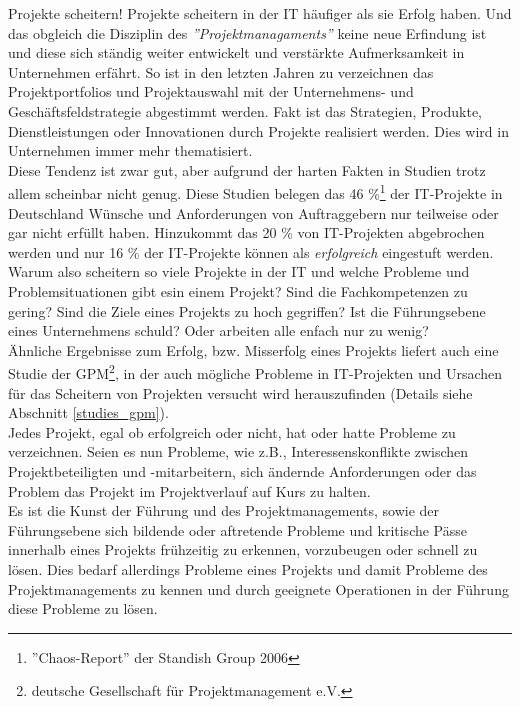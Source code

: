 \documentclass[12pt]{scrartcl}
\begin{document}
Projekte scheitern! Projekte scheitern in der IT häufiger als sie Erfolg haben. Und das obgleich die Disziplin des \textit{''Projektmanagaments''} keine neue Erfindung ist und diese sich ständig weiter entwickelt und verstärkte Aufmerksamkeit in Unternehmen erfährt. So ist in den letzten Jahren zu verzeichnen das Projektportfolios und Projektauswahl mit der Unternehmens- und Geschäftsfeldstrategie abgestimmt werden. Fakt ist das Strategien, Produkte, Dienstleistungen oder Innovationen durch Projekte realisiert werden. Dies wird in Unternehmen immer mehr thematisiert.\\
Diese Tendenz ist zwar gut, aber aufgrund der harten Fakten in Studien trotz allem scheinbar nicht genug. Diese Studien belegen das 46 \%\footnote{''Chaos-Report'' der Standish Group 2006} der IT-Projekte in Deutschland Wünsche und Anforderungen von Auftraggebern nur teilweise oder gar nicht erfüllt haben. Hinzukommt das 20 \% von IT-Projekten abgebrochen werden und nur 16 \% der IT-Projekte können als \textit{erfolgreich} eingestuft werden. Warum also scheitern so viele Projekte in der IT und welche Probleme und Problemsituationen gibt esin einem Projekt? Sind die Fachkompetenzen zu gering? Sind die Ziele eines Projekts zu hoch gegriffen? Ist die Führungsebene eines Unternehmens schuld? Oder arbeiten alle enfach nur zu wenig?\\
Ähnliche Ergebnisse zum Erfolg, bzw. Misserfolg eines Projekts liefert auch eine Studie der GPM\footnote{deutsche Gesellschaft für Projektmanagement e.V.}, in der auch mögliche Probleme in IT-Projekten und Ursachen für das Scheitern von Projekten versucht wird herauszufinden (Details siehe Abschnitt \ref{studies_gpm}).\\ 
Jedes Projekt, egal ob erfolgreich oder nicht, hat oder hatte Probleme zu verzeichnen. Seien es nun Probleme, wie z.B., Interessenskonflikte zwischen Projektbeteiligten und -mitarbeitern, sich ändernde Anforderungen oder das Problem das Projekt im Projektverlauf auf Kurs zu halten. \\
Es ist die Kunst der Führung und des Projektmanagements, sowie der Führungsebene sich bildende oder aftretende Probleme  und kritische Pässe innerhalb eines Projekts frühzeitig zu erkennen, vorzubeugen oder schnell zu lösen. Dies bedarf allerdings Probleme eines Projekts und damit Probleme des Projektmanagements zu kennen und durch geeignete Operationen in der Führung diese Probleme zu lösen.

\pagebreak
\end{document}
